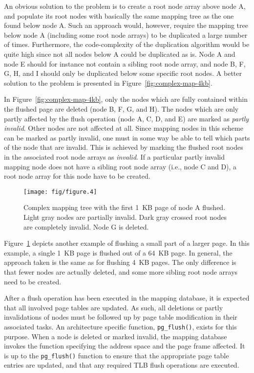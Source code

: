 \documentclass[a4paper,twoside]{book}
\begin{document}
An obvious solution to the problem is to create a root node array
above node A, and populate its root nodes with basically the same
mapping tree as the one found below node A.  Such an approach would,
however, require the mapping tree below node A (including some root
node arrays) to be duplicated a large number of times.  Furthermore,
the code-complexity of the duplication algorithm would be quite high
since not all nodes below A could be duplicated as is.  Node A and
node E should for instance not contain a sibling root node array, and
node B, F, G, H, and I should only be duplicated below some specific
root nodes.  A better solution to the problem is presented in
Figure~\ref{fig:complex-map-4kb}.

In Figure~\ref{fig:complex-map-4kb}, only the nodes which are fully
contained within the flushed page are deleted (node B, F, G, and H).
The nodes which are only partly affected by the flush operation (node
A, C, D, and E) are marked as \emph{partly invalid}.  Other nodes are
not affected at all.  Since mapping nodes in this scheme can be marked
as partly invalid, one must in some way be able to tell which parts of
the node that are invalid.  This is achieved by marking the flushed
root nodes in the associated root node arrays as \emph{invalid}.  If a
particular partly invalid mapping node does not have a sibling root
node array (i.e., node C and D), a root node array for this node have
to be created.

\begin{figure}[t]
  \begin{center}
    \texttt{[image: fig/figure.4]}
    \caption[Complex mapping tree with a 1~KB page flushed]{Complex
      mapping tree with the first 1~KB page of node A flushed.  Light
      gray nodes are partially invalid.  Dark gray crossed root nodes
      are completely invalid.  Node G is deleted. }
    \label{fig:complex-map-1kb}
  \end{center}
\end{figure}

Figure~\ref{fig:complex-map-1kb} depicts another example of flushing a 
small part of a larger page.  In this example, a single 1~KB page is
flushed out of a 64~KB page.  In general, the approach taken is the
same as for flushing 4~KB pages.  The only difference is that fewer
nodes are actually deleted, and some more sibling root node arrays
need to be created.

After a flush operation has been executed in the mapping database, it
is expected that all involved page tables are updated.  As such, all
deletions or partly invalidations of nodes must be followed up by page
table modification in their associated tasks.  An architecture
specific function, \texttt{pg\_flush()}, exists for this purpose.
When a node is deleted or marked invalid, the mapping database invokes
the function specifying the address space and the page frame affected.
It is up to the \texttt{pg\_flush()} function to ensure that the
appropriate page table entries are updated, and that any required TLB
flush operations are executed.
\end{document}
